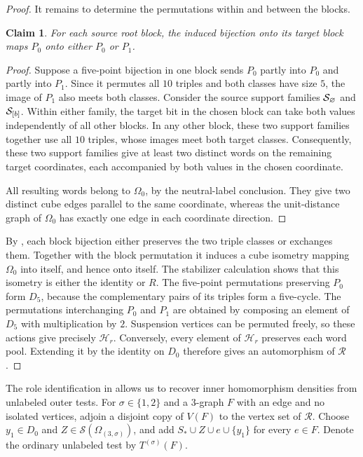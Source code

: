 \documentclass[10pt]{article}
\numberwithin{equation}{section}
\newtheorem{claim}[claim]{Claim}\aliascntresetthe{claim}
\theoremstyle{definition}
\begin{document}
\begin{proof}
It remains to determine the permutations within and between the blocks.
\begin{claim}\label{clm:tripleclasses}
For each source root block, the induced bijection onto its target block maps $P_0$ onto either $P_0$ or $P_1$.
\end{claim}
\begin{proof}
Suppose a five-point bijection in one block sends $P_0$ partly into $P_0$ and partly into $P_1$. Since it permutes all $10$ triples and both classes have size $5$, the image of $P_1$ also meets both classes. Consider the source support families $\mathcal S_{\varnothing}$ and $\mathcal S_{[b]}$. Within either family, the target bit in the chosen block can take both values independently of all other blocks. In any other block, these two support families together use all $10$ triples, whose images meet both target classes. Consequently, these two support families give at least two distinct words on the remaining target coordinates, each accompanied by both values in the chosen coordinate.

All resulting words belong to $\Omega_0$, by the neutral-label conclusion. They give two distinct cube edges parallel to the same coordinate, whereas the unit-distance graph of $\Omega_0$ has exactly one edge in each coordinate direction.
\end{proof}

By , each block bijection either preserves the two triple classes or exchanges them. Together with the block permutation it induces a cube isometry mapping $\Omega_0$ into itself, and hence onto itself. The stabilizer calculation shows that this isometry is either the identity or $R$. The five-point permutations preserving $P_0$ form $D_5$, because the complementary pairs of its triples form a five-cycle. The permutations interchanging $P_0$ and $P_1$ are obtained by composing an element of $D_5$ with multiplication by $2$. Suspension vertices can be permuted freely, so these actions give precisely $\mathscr H_r$. Conversely, every element of $\mathscr H_r$ preserves each word pool. Extending it by the identity on $D_0$ therefore gives an automorphism of $\mathscr R$.
\end{proof}

The role identification in  allows us to recover inner homomorphism densities from unlabeled outer tests. For $\sigma\in\{1,2\}$ and a $3$-graph $F$ with an edge and no isolated vertices, adjoin a disjoint copy of $V(F)$ to the vertex set of $\mathscr R$. Choose $y_1\in D_0$ and $Z\in\mathcal S(\Omega_{(3,\sigma)})$, and add $S_*\cup Z\cup e\cup\{y_1\}$ for every $e\in F$. Denote the ordinary unlabeled test by $T^{(\sigma)}(F)$.
\end{document}
